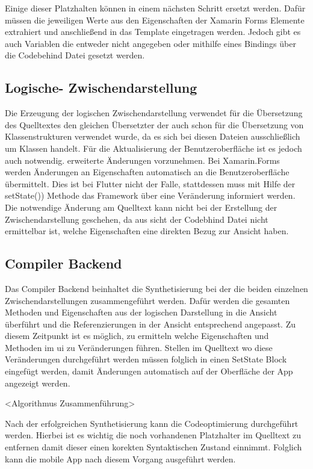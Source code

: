 Einige dieser Platzhalten können in einem nächsten Schritt ersetzt werden.  Dafür müssen die jeweiligen Werte aus den Eigenschaften der Xamarin Forms Elemente extrahiert und anschließend in das Template eingetragen werden.  Jedoch gibt es auch Variablen die entweder nicht angegeben oder mithilfe eines Bindings über die Codebehind Datei gesetzt werden.   

\subsection{Logische- Zwischendarstellung}
Die Erzeugung der logischen Zwischendarstellung verwendet für die Übersetzung des \Csharp Quelltextes den gleichen Übersetzter der auch schon für die Übersetzung von Klassenstrukturen verwendet wurde,  da es sich bei diesen Dateien ausschließlich um \Csharp Klassen handelt.  Für die Aktualisierung der Benutzeroberfläche ist es jedoch auch notwendig. erweiterte Änderungen vorzunehmen.  Bei Xamarin.Forms werden Änderungen an Eigenschaften automatisch an die Benutzeroberfläche übermittelt. Dies ist bei Flutter nicht der Falle,  stattdessen muss mit Hilfe der setState()) Methode das Framework über eine Veränderung informiert werden.  Die notwendige Änderung am Quelltext kann nicht bei der Erstellung der Zwischendarstellung geschehen, da aus sicht der Codebhind Datei nicht ermittelbar ist,  welche Eigenschaften eine direkten Bezug zur Ansicht haben. 


\subsection{Compiler Backend}
Das Compiler Backend beinhaltet die Synthetisierung bei der die beiden einzelnen Zwischendarstellungen zusammengeführt werden.  Dafür werden die gesamten Methoden und Eigenschaften aus der logischen Darstellung in die Ansicht überführt und die Referenzierungen in der Ansicht entsprechend angepasst.  Zu diesem Zeitpunkt ist es möglich,  zu ermitteln welche Eigenschaften und Methoden im \ac{ui} zu Veränderungen führen.  Stellen im Quelltext wo diese Veränderungen durchgeführt werden müssen folglich in einen SetState Block eingefügt werden,  damit Änderungen automatisch auf der Oberfläche der App angezeigt werden.

<Algorithmus Zusammenführung>


Nach der erfolgreichen Synthetisierung kann die Codeoptimierung durchgeführt werden.  Hierbei ist es wichtig die noch vorhandenen Platzhalter im Quelltext zu entfernen damit dieser einen korekten Syntaktischen Zustand einnimmt.  Folglich kann die mobile App nach diesem Vorgang ausgeführt werden. 

